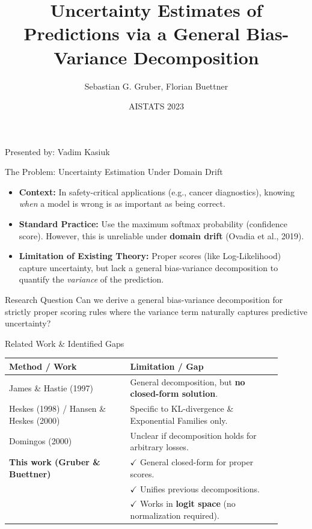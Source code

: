 \documentclass[aspectratio=169, 10pt]{beamer}
\title{Uncertainty Estimates of Predictions via a General Bias-Variance Decomposition}
\author{Sebastian G. Gruber, Florian Buettner}
\date{AISTATS 2023}
\begin{document}
\begin{frame}
    \titlepage
    \begin{center}
        \tiny{Presented by: Vadim Kasiuk}
    \end{center}
\end{frame}

\begin{frame}{The Problem: Uncertainty Estimation Under Domain Drift}
    \begin{itemize}
        \item \textbf{Context:} In safety-critical applications (e.g., cancer diagnostics), knowing \emph{when} a model is wrong is as important as being correct.
        \item \textbf{Standard Practice:} Use the maximum softmax probability (confidence score). However, this is unreliable under \textbf{domain drift} (Ovadia et al., 2019).
        \item \textbf{Limitation of Existing Theory:} Proper scores (like Log-Likelihood) capture uncertainty, but lack a general bias-variance decomposition to quantify the \emph{variance} of the prediction.
    \end{itemize}
    \vfill
    \begin{block}{Research Question}
        Can we derive a general bias-variance decomposition for strictly proper scoring rules where the variance term naturally captures predictive uncertainty?
    \end{block}
\end{frame}

\begin{frame}{Related Work \& Identified Gaps}
    \begin{table}[]
        \centering
        \begin{tabular}{p{0.4\linewidth} p{0.5\linewidth}}
            \hline
            \textbf{Method / Work} & \textbf{Limitation / Gap} \\
            \hline
            James \& Hastie (1997) & General decomposition, but \textbf{no closed-form solution}. \\
            Heskes (1998) / Hansen \& Heskes (2000) & Specific to KL-divergence \& Exponential Families only. \\
            Domingos (2000) & Unclear if decomposition holds for arbitrary losses. \\
            \textbf{This work (Gruber \& Buettner)} & $\checkmark$ General closed-form for proper scores. \\
            & $\checkmark$ Unifies previous decompositions. \\
            & $\checkmark$ Works in \textbf{logit space} (no normalization required). \\
            \hline
        \end{tabular}
    \end{table}
\end{frame}
\end{document}
